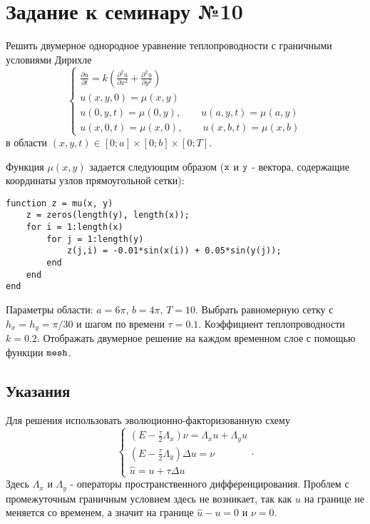 \section{Задание к семинару №10}
Решить двумерное однородное уравнение теплопроводности с граничными условиями Дирихле 
\begin{equation} \label{c10eq1}
	\begin{cases}
		\displaystyle \frac{\partial u}{\partial t} = k \left( \frac{\partial^2 u}{\partial x^2} + \frac{\partial^2 u}{\partial y^2} \right) \\
		\displaystyle u(x,y,0) = \mu(x,y) \\
		u(0,y,t) = \mu(0,y), \qquad u(a,y,t) = \mu(a,y)\\  
		u(x,0,t) = \mu(x,0), \qquad u(x,b,t) = \mu(x,b)
	\end{cases}
\end{equation}
в области $(x,y,t) \in [0; a] \times [0; b] \times [0; T]$.

Функция $\mu(x,y)$ задается следующим образом ($\texttt{\lstinline|x|}$ и $\texttt{\lstinline|y|}$ - вектора, содержащие координаты узлов прямоугольной сетки):
\begin{matlablisting}
	\begin{lstlisting}
function z = mu(x, y)
    z = zeros(length(y), length(x));
    for i = 1:length(x)
        for j = 1:length(y)
            z(j,i) = -0.01*sin(x(i)) + 0.05*sin(y(j));
        end
    end
end
	\end{lstlisting}
\end{matlablisting}
Параметры области: $a = 6\pi$, $b = 4\pi$, $T = 10$. Выбрать равномерную сетку с $h_x = h_y = \pi/30$ и шагом по времени $\tau = 0.1$. Коэффициент теплопроводности $k = 0.2$. Отображать двумерное решение на каждом временном слое с помощью функции $\texttt{\lstinline|mesh|}$.

\subsection{Указания}
Для решения использовать эволюционно-факторизованную схему
\begin{equation} \label{c10eq2}
	\begin{cases}
		\displaystyle \left( E - \frac{\tau}{2} \Lambda_x \right) \nu = \Lambda_x u + \Lambda_y u \\
		\displaystyle \left( E - \frac{\tau}{2} \Lambda_y \right) \Delta u = \nu \\
		\hat{u} = u + \tau \Delta u
	\end{cases}.
\end{equation}
Здесь $\Lambda_x$ и $\Lambda_y$ - операторы пространственного дифференцирования. Проблем с промежуточным граничным условием здесь не возникает, так как $u$ на границе не меняется со временем, а значит на границе $\hat{u} - u = 0$ и $\nu = 0$.

